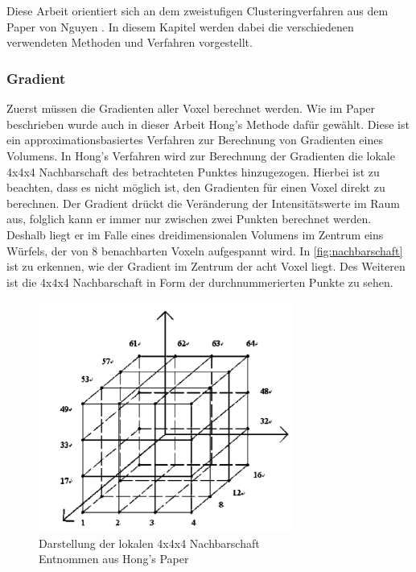 \chapter{}
\label{sec:methods}


Diese Arbeit orientiert sich an dem zweistufigen Clusteringverfahren aus dem Paper von Nguyen \cite{nguyen2012clustering}. In diesem Kapitel werden dabei die verschiedenen verwendeten Methoden und Verfahren vorgestellt.

\subsection{Gradient}

Zuerst müssen die Gradienten aller Voxel berechnet werden. Wie im Paper beschrieben wurde auch in dieser Arbeit Hong's Methode \cite{hong2003method} dafür gewählt. Diese ist ein approximationsbasiertes Verfahren zur Berechnung von Gradienten eines Volumens. 
\newline
In Hong's Verfahren wird zur Berechnung der Gradienten die lokale 4x4x4 Nachbarschaft des betrachteten Punktes hinzugezogen.
\newline
Hierbei ist zu beachten, dass es nicht möglich ist, den Gradienten für einen Voxel direkt zu berechnen. Der Gradient drückt die Veränderung der Intensitätswerte im Raum aus, folglich kann er immer nur zwischen zwei Punkten berechnet werden. Deshalb liegt er im Falle eines dreidimensionalen Volumens im Zentrum eins Würfels, der von 8 benachbarten Voxeln aufgespannt wird.
\newline
In \autoref{fig:nachbarschaft} ist zu erkennen, wie der Gradient im Zentrum der acht Voxel liegt. Des Weiteren ist die 4x4x4 Nachbarschaft in Form der durchnummerierten Punkte zu sehen.
\newline

\begin{figure}[!h] 
\centering 
\includegraphics[width=0.75\textwidth]{Logos/VoxelEdges.PNG}
\caption{Darstellung der lokalen 4x4x4 Nachbarschaft  \\ Entnommen aus Hong's Paper} 
\label{fig:nachbarschaft} 
\end{figure}


